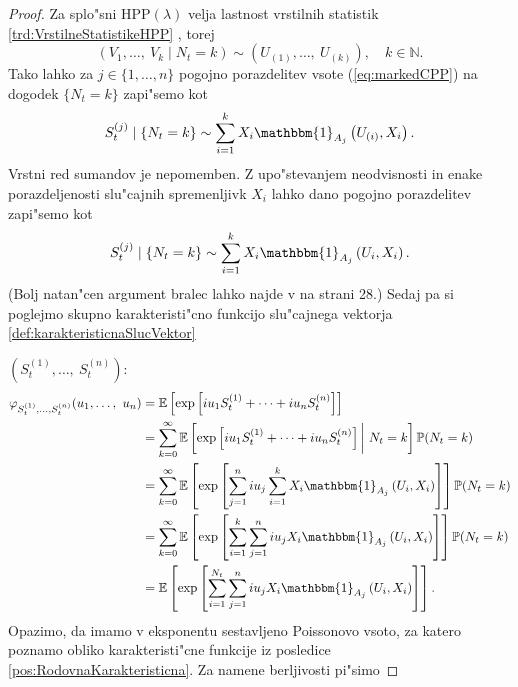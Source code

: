 \documentclass[12pt, a4paper, reqno]{amsart}
\theoremstyle{definition}
\theoremstyle{plain}
\newcommand{\N}{\mathbb{N}}
\newcommand{\E}{\mathbb{E}}
\newcommand{\Prob}{\mathbb{P}}
\newcommand{\1}{\mathds{1}}
\newcommand*{\refPriloga}[1]{%
  \begingroup
    \hypersetup{
      linkcolor=red,
      linkbordercolor=red,
    }%
    \ref{#1}%
  \endgroup
}
\begin{document}
        \begin{proof}
            Za splo"sni $\text{HPP}(\lambda)$ velja lastnost vrstilnih statistik \refPriloga{trd:VrstilneStatistikeHPP},
            torej
            \begin{equation*}
                \left(V_1, \dots, \ V_k \mid N_t = k\right)\sim \left(U_{(1)}, \dots, \ U_{(k)}\right), \quad k\in\N.
            \end{equation*}
            Tako lahko za $j\in\{1, \dots, n\}$ pogojno porazdelitev vsote (\ref{eq:markedCPP}) na dogodek $\{N_t = k\}$ zapi"semo kot
            \begin{equation*}
                S_t^{(j)}\mid \{N_t = k\} \sim \sum_{i=1}^{k}X_i\mathbbm{1}_{A_j}\left(U_{(i)}, X_i\right).
            \end{equation*}
            Vrstni red sumandov je nepomemben. Z upo"stevanjem neodvisnosti in enake 
            porazdeljenosti slu"cajnih spremenljivk $X_i$ lahko dano pogojno porazdelitev zapi"semo kot 
            \begin{equation*}
                S_t^{(j)}\mid \{N_t = k\} \sim \sum_{i=1}^{k}X_i\mathbbm{1}_{A_j}\left(U_{i}, X_i\right).
            \end{equation*}
            (Bolj natan"cen argument bralec lahko najde v \cite{4} na strani 28.)
            Sedaj pa si poglejmo skupno karakteristi"cno funkcijo slu"cajnega vektorja \refPriloga{def:karakteristicnaSlucVektor}
            $(S_t^{(1)}, \dots, \ S_t^{(n)})$:
            \begin{align*}
                \varphi_{S_t^{(1)},\dots, S_t^{(n)}}(u_1, \dots, \ u_n) 
                    &= \E\left[\exp\left[iu_1S_t^{(1)} + \dots + iu_nS_t^{(n)}\right]\right] \\
                    &= \sum_{k =0}^\infty \E\left[\exp\left[iu_1S_t^{(1)} + \dots + iu_nS_t^{(n)}\right]\bigg| \ N_t = k\right]\Prob(N_t = k)\\
                    &= \sum_{k=0}^\infty \E\left[\exp\left[\sum_{j=1}^niu_j\sum_{i=1}^kX_i\mathbbm{1}_{A_j}\left(U_i, X_i\right)\right]\right]\Prob(N_t = k)\\
                    &= \sum_{k=0}^\infty \E\left[\exp\left[\sum_{i=1}^k\sum_{j=1}^niu_jX_i\mathbbm{1}_{A_j}\left(U_i, X_i\right)\right]\right]\Prob(N_t = k)\\
                    &= \E\left[\exp\left[\sum_{i=1}^{N_t}\sum_{j=1}^niu_jX_i\mathbbm{1}_{A_j}\left(U_i, X_i\right)\right]\right]. 
            \end{align*}
            Opazimo, da imamo v eksponentu sestavljeno Poissonovo vsoto, za katero poznamo obliko karakteristi"cne 
            funkcije iz posledice \ref{pos:RodovnaKarakteristicna}. Za namene berljivosti pi"simo


\end{proof}
\end{document}
